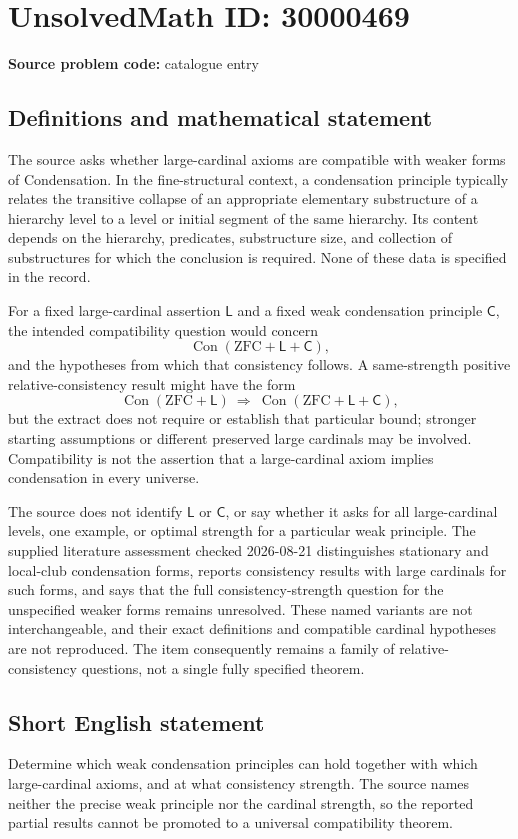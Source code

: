 \documentclass[11pt]{article}
\begin{document}
\section*{UnsolvedMath ID: 30000469}
\textbf{Source problem code:} catalogue entry
\subsection{Definitions and mathematical statement}
The source asks whether large-cardinal axioms are compatible with weaker forms of Condensation. In the fine-structural context, a condensation principle typically relates the transitive collapse of an appropriate elementary substructure of a hierarchy level to a level or initial segment of the same hierarchy. Its content depends on the hierarchy, predicates, substructure size, and collection of substructures for which the conclusion is required. None of these data is specified in the record.

For a fixed large-cardinal assertion \(\mathsf L\) and a fixed weak condensation principle \(\mathsf C\), the intended compatibility question would concern
\[
\operatorname{Con}(\mathrm{ZFC}+\mathsf L+\mathsf C),
\]
and the hypotheses from which that consistency follows. A same-strength positive relative-consistency result might have the form
\[
\operatorname{Con}(\mathrm{ZFC}+\mathsf L)
\ \Longrightarrow\ 
\operatorname{Con}(\mathrm{ZFC}+\mathsf L+\mathsf C),
\]
but the extract does not require or establish that particular bound; stronger starting assumptions or different preserved large cardinals may be involved. Compatibility is not the assertion that a large-cardinal axiom implies condensation in every universe.

The source does not identify \(\mathsf L\) or \(\mathsf C\), or say whether it asks for all large-cardinal levels, one example, or optimal strength for a particular weak principle. The supplied literature assessment checked 2026-08-21 distinguishes stationary and local-club condensation forms, reports consistency results with large cardinals for such forms, and says that the full consistency-strength question for the unspecified weaker forms remains unresolved. These named variants are not interchangeable, and their exact definitions and compatible cardinal hypotheses are not reproduced. The item consequently remains a family of relative-consistency questions, not a single fully specified theorem.
\subsection{Short English statement}
Determine which weak condensation principles can hold together with which large-cardinal axioms, and at what consistency strength. The source names neither the precise weak principle nor the cardinal strength, so the reported partial results cannot be promoted to a universal compatibility theorem.
\end{document}
